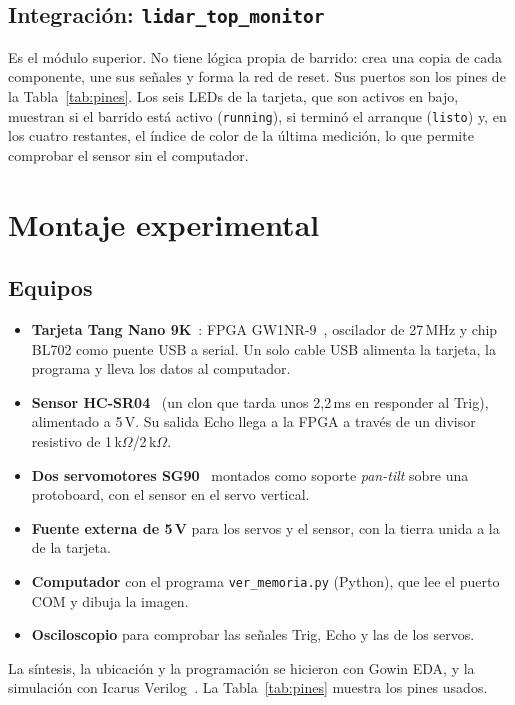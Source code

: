 \documentclass[conference]{IEEEtran}
\newcommand{\mo}[1]{\texttt{#1}}
\begin{document}
\subsection{Integración: \mo{lidar\_top\_monitor}}
Es el módulo superior. No tiene lógica propia de barrido: crea una copia de cada componente, une sus señales y forma la red de reset. Sus puertos son los pines de la Tabla~\ref{tab:pines}. Los seis LEDs de la tarjeta, que son activos en bajo, muestran si el barrido está activo (\mo{running}), si terminó el arranque (\mo{listo}) y, en los cuatro restantes, el índice de color de la última medición, lo que permite comprobar el sensor sin el computador.

\section{Montaje experimental}

\subsection{Equipos}
\begin{itemize}
\item \textbf{Tarjeta Tang Nano 9K}~\cite{tangnano}: FPGA GW1NR-9~\cite{gw1nr}, oscilador de 27\,MHz y chip BL702 como puente USB a serial. Un solo cable USB alimenta la tarjeta, la programa y lleva los datos al computador.
\item \textbf{Sensor HC-SR04}~\cite{hcsr04} (un clon que tarda unos 2,2\,ms en responder al Trig), alimentado a 5\,V. Su salida Echo llega a la FPGA a través de un divisor resistivo de 1\,k$\Omega$/2\,k$\Omega$.
\item \textbf{Dos servomotores SG90}~\cite{sg90} montados como soporte \emph{pan-tilt} sobre una protoboard, con el sensor en el servo vertical.
\item \textbf{Fuente externa de 5\,V} para los servos y el sensor, con la tierra unida a la de la tarjeta.
\item \textbf{Computador} con el programa \mo{ver\_memoria.py} (Python), que lee el puerto COM y dibuja la imagen.
\item \textbf{Osciloscopio} para comprobar las señales Trig, Echo y las de los servos.
\end{itemize}
La síntesis, la ubicación y la programación se hicieron con Gowin EDA, y la simulación con Icarus Verilog~\cite{icarus}. La Tabla~\ref{tab:pines} muestra los pines usados.
\end{document}
